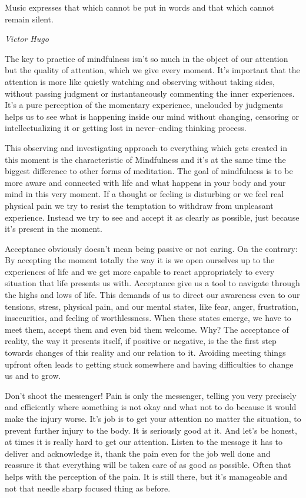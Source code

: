 \documentclass[../Book.Stress_regulation.tex]{subfiles}
\begin{document}
\epigraph{Music expresses that which cannot be put in words and that which cannot remain silent.}{\textit{Victor Hugo}}


{The key to practice of mindfulness} isn't so much in the object of our attention but the {quality of attention}, which we give every moment.
It's important that the attention is more like {quietly watching} and observing without taking sides, without passing judgment or instantaneously commenting the inner experiences.
It's a {pure perception}  of the momentary experience, unclouded by judgments helps us to see what is happening inside our mind {without changing}, censoring or intellectualizing it
or getting lost in never--ending thinking process.


This {observing and investigating} approach to everything which gets created in this moment is the characteristic of Mindfulness and it's at the same time the biggest difference to other forms of meditation.
The goal of mindfulness is to {be more aware and connected} with life and what happens in your body and your mind in this very moment.
If a thought or feeling is disturbing or we feel real physical {pain} we try to resist the temptation to withdraw from unpleasant experience.
Instead we try to see and accept it as clearly as possible, just because it's {present in the moment}.

Acceptance obviously doesn’t mean being passive or not caring.
On the contrary: By {accepting the moment} totally the way it is we {open ourselves} up to the experiences of life   
and we get more capable to {react appropriately} to every situation that life presents us with.
Acceptance give us a tool to navigate through the highs and lows of life. This demands of us to direct our awareness even to our tensions, stress, physical pain, and our mental states, like fear,
anger, frustration, insecurities, and feeling of worthlessness.
When these states emerge, {we have to meet them}, accept them and even bid them welcome.
Why? The acceptance of reality, the way it presents itself, if positive or negative, is the the {first step towards changes} of this reality and our relation to it.
 Avoiding meeting things upfront often leads to getting stuck somewhere and having difficulties to change us and to grow.


 {Don't shoot the messenger!}
Pain is only the messenger, telling you very precisely and efficiently {where something is not okay} and {what not to do} because it would make the injury worse.
It's job is to {get your attention} no matter the situation, to prevent further injury to the body. It is seriously good at it. And let's be honest, at times it is really hard to get our attention.
Listen to the message it has to deliver and {acknowledge it}, thank the pain even for the job well done and reassure it that everything will be taken care of as good as possible. 
Often that helps with the {perception of the pain}. It is still there, but it's manageable and not that needle sharp focused thing as before.
\end{document}
